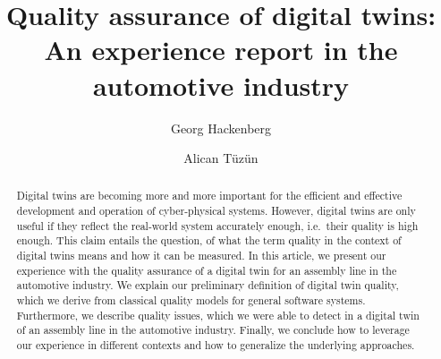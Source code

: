 \documentclass{llncs}
\begin{document}
    \title{Quality assurance of digital twins: An experience report in the automotive industry}

    \author{Georg Hackenberg
    \and
    Alican Tüzün
    }
    
    \maketitle

    \begin{abstract}
        Digital twins are becoming more and more important for the efficient and effective development and operation of cyber-physical systems.
        However, digital twins are only useful if they reflect the real-world system accurately enough, i.e.\ their quality is high enough.
        This claim entails the question, of what the term quality in the context of digital twins means and how it can be measured.
        In this article, we present our experience with the quality assurance of a digital twin for an assembly line in the automotive industry.
        We explain our preliminary definition of digital twin quality, which we derive from classical quality models for general software systems.
        Furthermore, we describe quality issues, which we were able to detect in a digital twin of an assembly line in the automotive industry.
        Finally, we conclude how to leverage our experience in different contexts and how to generalize the underlying approaches.
    \end{abstract}
\end{document}

